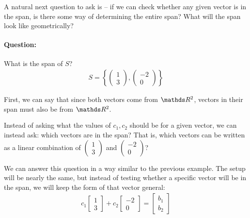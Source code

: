 \documentclass[11pt]{article}
\newcommand{\ques}{\paragraph{Question:}}
\begin{document}
A natural next question to ask is -- if we can check whether any given vector is in the span, is there some way of determining the entire span? What will the span look like geometrically?

\ques What is the span of $S$?
\begin{align*}
S = \left\{ \begin{pmatrix}1\\3\end{pmatrix}, \begin{pmatrix}-2\\0\end{pmatrix} \right\}
\end{align*}

First, we can say that since both vectors come from $\bbR^2$, vectors in their span must also be from $\bbR^2$.

Instead of asking what the values of $c_1,c_2$ should be for a given vector, we can instead ask: which vectors are in the span? That is, which vectors can be written as a linear combination of $\begin{pmatrix}1\\3\end{pmatrix}$ and $\begin{pmatrix}-2\\0\end{pmatrix}$?

We can answer this question in a way similar to the previous example. The setup will be nearly the same, but instead of testing whether a specific vector will be in the span, we will keep the form of that vector general:
\begin{align*}
c_1 \begin{bmatrix}1\\3\end{bmatrix} + c_2 \begin{bmatrix}-2\\0\end{bmatrix} = \begin{bmatrix}b_1\\b_2\end{bmatrix}
\end{align*}
\end{document}
